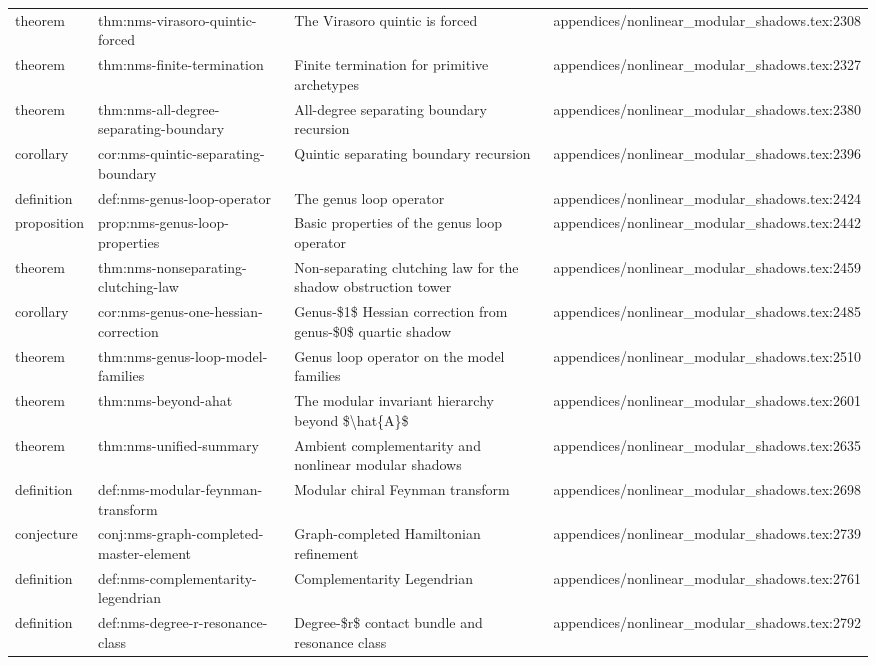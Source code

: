 \documentclass[11pt]{article}
\begin{document}
\begin{longtable}{L{0.10\textwidth}L{0.26\textwidth}L{0.42\textwidth}L{0.22\textwidth}}
theorem & thm:nms-virasoro-quintic-forced & The Virasoro quintic is forced & appendices/nonlinear\_modular\_shadows.tex:2308\\
theorem & thm:nms-finite-termination & Finite termination for primitive archetypes & appendices/nonlinear\_modular\_shadows.tex:2327\\
theorem & thm:nms-all-degree-separating-boundary & All-degree separating boundary recursion & appendices/nonlinear\_modular\_shadows.tex:2380\\
corollary & cor:nms-quintic-separating-boundary & Quintic separating boundary recursion & appendices/nonlinear\_modular\_shadows.tex:2396\\
definition & def:nms-genus-loop-operator & The genus loop operator & appendices/nonlinear\_modular\_shadows.tex:2424\\
proposition & prop:nms-genus-loop-properties & Basic properties of the genus loop operator & appendices/nonlinear\_modular\_shadows.tex:2442\\
theorem & thm:nms-nonseparating-clutching-law & Non-separating clutching law for the shadow obstruction tower & appendices/nonlinear\_modular\_shadows.tex:2459\\
corollary & cor:nms-genus-one-hessian-correction & Genus-\$1\$ Hessian correction from genus-\$0\$ quartic shadow & appendices/nonlinear\_modular\_shadows.tex:2485\\
theorem & thm:nms-genus-loop-model-families & Genus loop operator on the model families & appendices/nonlinear\_modular\_shadows.tex:2510\\
theorem & thm:nms-beyond-ahat & The modular invariant hierarchy beyond \$\textbackslash{}hat\{A\}\$ & appendices/nonlinear\_modular\_shadows.tex:2601\\
theorem & thm:nms-unified-summary & Ambient complementarity and nonlinear modular shadows & appendices/nonlinear\_modular\_shadows.tex:2635\\
definition & def:nms-modular-feynman-transform & Modular chiral Feynman transform & appendices/nonlinear\_modular\_shadows.tex:2698\\
conjecture & conj:nms-graph-completed-master-element & Graph-completed Hamiltonian refinement & appendices/nonlinear\_modular\_shadows.tex:2739\\
definition & def:nms-complementarity-legendrian & Complementarity Legendrian & appendices/nonlinear\_modular\_shadows.tex:2761\\
definition & def:nms-degree-r-resonance-class & Degree-\$r\$ contact bundle and resonance class & appendices/nonlinear\_modular\_shadows.tex:2792\\

\end{longtable}
\end{document}
